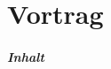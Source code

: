
\begin{frame}[plain]
  \titlepage
\end{frame}
 \part{Vortrag}
 \begin{frame}
 	\frametitle{Inhalt}
 	\tableofcontents[%
 	]
 \end{frame}